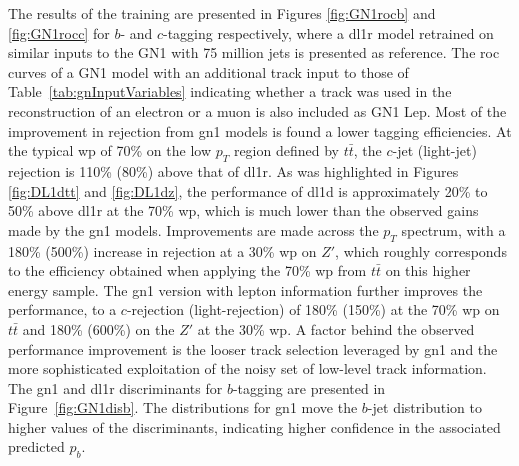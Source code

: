 The results of the training are presented in Figures \ref{fig:GN1rocb} and \ref{fig:GN1rocc} for $b$- and $c$-tagging respectively, where a \gls{dl1r} model retrained on similar inputs to the GN1 with 75 million jets is presented as reference. The \gls{roc} curves of a GN1 model with an additional track input to those of Table~\ref{tab:gnInputVariables} indicating whether a track was used in the reconstruction of an electron or a muon is also included as GN1 Lep. Most of the improvement in rejection from \gls{gn1} models is found a lower tagging efficiencies. At the typical \gls{wp} of 70\% on the low $p_T$ region defined by $t\bar{t}$, the $c$-jet (light-jet) rejection is 110\% (80\%) above that of \gls{dl1r}. As was highlighted in Figures \ref{fig:DL1dtt} and \ref{fig:DL1dz}, the performance of \gls{dl1d} is approximately 20\% to 50\% above \gls{dl1r} at the 70\% \gls{wp}, which is much lower than the observed gains made by the \gls{gn1} models. Improvements are made across the  $p_T$ spectrum, with a 180\% (500\%) increase in rejection at a 30\% \gls{wp} on $Z'$, which roughly corresponds to the efficiency obtained when applying the 70\% \gls{wp} from $t\bar{t}$ on this higher energy sample. The \gls{gn1} version with lepton information further improves the performance, to a $c$-rejection (light-rejection) of 180\% (150\%) at the 70\% \gls{wp} on $t\bar{t}$ and 180\% (600\%) on the $Z'$ at the 30\% \gls{wp}. A factor behind the observed performance improvement is the looser track selection leveraged by \gls{gn1} and the more sophisticated exploitation of the noisy set of low-level track information. The \gls{gn1} and \gls{dl1r} discriminants for $b$-tagging are presented in Figure~\ref{fig:GN1disb}. The distributions for \gls{gn1} move the $b$-jet distribution to higher values of the discriminants, indicating higher confidence in the associated predicted $p_b$. 

